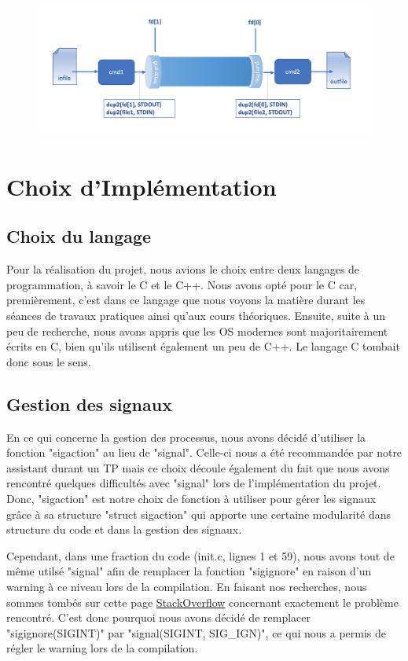\documentclass[utf8]{article}
\begin{document}
\vspace{1.5cm}
\begin{figure}[h]
    \centering
    \includegraphics[scale=0.4]{pipes.png}
\end{figure}


\newpage
\section{Choix d’Implémentation}
\subsection{Choix du langage}
Pour la réalisation du projet, nous avions le choix entre deux langages de programmation, à savoir le C et le C++.
Nous avons opté pour le C car, premièrement, c'est dans ce langage que nous voyons la matière durant les séances de travaux pratiques ainsi qu'aux cours théoriques. 
Ensuite, suite à un peu de recherche, nous avons appris que les OS modernes sont majoritairement écrits en C, bien qu'ils utilisent également un peu de C++. Le langage
C tombait donc sous le sens.

\subsection{Gestion des signaux}
En ce qui concerne la gestion des processus, nous avons décidé d'utiliser la fonction "sigaction" au lieu de "signal". Celle-ci nous a été recommandée par notre assistant durant un TP
mais ce choix découle également du fait que nous avons rencontré quelques difficultés avec "signal" lors de l'implémentation du projet. Donc, "sigaction" est notre choix de fonction à utiliser pour 
gérer les signaux grâce à sa structure "struct sigaction" qui apporte une certaine modularité dans structure du code et dans la gestion des signaux. 

Cependant, dans une fraction du code (init.c, lignes 1 et 59), nous avons tout de même utilsé "signal" afin de remplacer la fonction "sigignore" en raison d'un warning à ce niveau lors de la compilation. 
En faisant nos recherches, nous sommes tombés sur cette page \href{https://stackoverflow.com/questions/36696318/handling-warning-implicit-declaration-of-function-sigignore}{StackOverflow} concernant exactement
le problème rencontré. C'est donc pourquoi nous avons décidé de remplacer "sigignore(SIGINT)" par "signal(SIGINT, SIG\_IGN)", ce qui nous a permis de régler le warning lors de la compilation.
\end{document}
